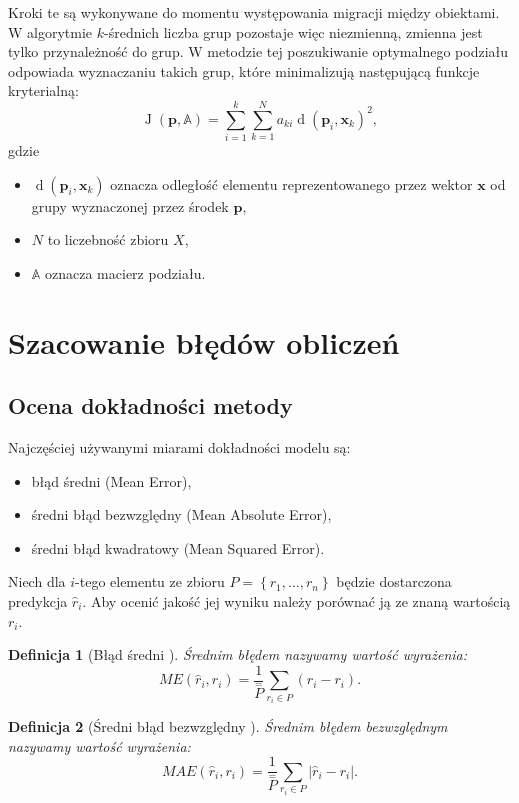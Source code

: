 \documentclass[12pt,a4paper]{report}
\newtheorem{df}{Definicja}[chapter]
\newcommand{\set}[1]{\left\lbrace {#1} \right\rbrace}
\newcommand{\J}[2]{\operatorname{J}\left({#1}, {#2} \right)}
\newcommand{\distance}[2]{\operatorname{d}\left({#1}, {#2} \right)}
\begin{document}
Kroki te są wykonywane do momentu występowania migracji między obiektami.
W algorytmie $k$-średnich liczba grup pozostaje więc niezmienną, zmienna jest tylko przynależność do grup.
W metodzie tej poszukiwanie optymalnego podziału odpowiada wyznaczaniu takich grup, które minimalizują następującą funkcje kryterialną:
$$
\J{\mathbf{p}}{\mathbb{A}} = \sum_{i=1}^k \sum_{k=1}^N a_{ki}\distance{\mathbf{p}_i}{\mathbf{x}_k}^2,
$$
gdzie 
\begin{itemize}
\item $\distance{\mathbf{p}_i}{\mathbf{x}_k}$ oznacza odległość elementu reprezentowanego przez wektor $\mathbf{x}$ od grupy wyznaczonej przez środek $\mathbf{p}$,
\item $N$ to liczebność zbioru $\mathit{X}$,
\item $\mathbb{A}$ oznacza macierz podziału.
\end{itemize}
 
\section{Szacowanie błędów obliczeń}
\subsection{Ocena dokładności metody}%
Najczęściej używanymi miarami dokładności modelu są:
\begin{itemize}
\item błąd średni (Mean Error),
\item średni błąd bezwzględny (Mean Absolute Error),
\item średni błąd kwadratowy (Mean Squared Error).
\end{itemize}

Niech dla $i$-tego elementu ze zbioru $\mathit{P} = \set{r_1, \ldots, r_n}$ będzie dostarczona predykcja $\widehat{r}_i$. Aby ocenić jakość jej wyniku należy porównać ją ze znaną wartością $r_i$.

\begin{df}[Błąd średni {\citep[Sec 4.1.1]{rsh}}]
Średnim błędem nazywamy wartość wyrażenia:
$$
\mathit{ME}(\widehat{r}_i,r_i) = \frac{1}{\stackrel{=}{\mathit{P}}}\sum_{r_i \in \mathit{P}}(\widehat{r}_i-r_i).
$$
\end{df}

\begin{df}[Średni błąd bezwzględny  {\citep[Sec 4.1.1]{rsh}}]
Średnim błędem bezwzględnym nazywamy wartość wyrażenia:
$$
\mathit{MAE}(\widehat{r}_i,r_i) = \frac{1}{\stackrel{=}{\mathit{P}}}\sum_{r_i \in \mathit{P}}|\widehat{r}_i-r_i|.
$$
\end{df}
\end{document}
